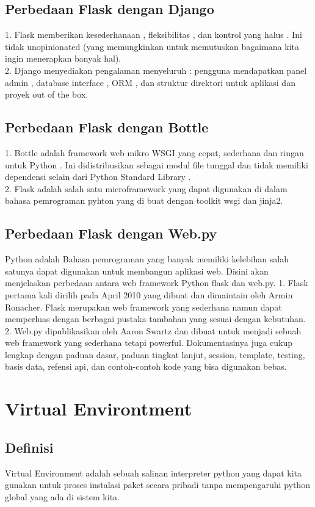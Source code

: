 \documentclass[12pt,a4paper]{article}
\begin{document}
\subsection{Perbedaan Flask dengan Django}
1.	Flask memberikan kesederhanaan , fleksibilitas , dan kontrol yang halus . Ini tidak unopinionated (yang memungkinkan untuk memutuskan bagaimana kita ingin menerapkan banyak hal).\\
2.  Django menyediakan pengalaman menyeluruh : pengguna mendapatkan panel admin , database interface , ORM , dan struktur direktori untuk aplikasi dan proyek out of the box.
\subsection{Perbedaan Flask dengan Bottle}
1.	Bottle adalah framework web mikro WSGI yang cepat, sederhana dan ringan untuk Python . Ini didistribusikan sebagai modul file tunggal dan tidak memiliki dependensi selain dari Python Standard Library .\\
2.	Flask adalah salah satu microframework yang dapat digunakan di dalam bahasa pemrograman pyhton yang di buat dengan toolkit wsgi dan jinja2.
\subsection{Perbedaan Flask dengan Web.py}
Python adalah Bahasa pemrograman yang banyak memiliki kelebihan salah satunya dapat digunakan untuk membangun aplikasi web. Disini akan menjelaskan perbedaan antara web framework Python flask dan web.py.
1.	Flask pertama kali dirilih pada April 2010 yang dibuat dan dimaintain oleh Armin Ronacher. Flask merupakan web framework yang sederhana namun dapat memperluas dengan berbagai pustaka tambahan yang sesuai dengan kebutuhan.
2.	Web.py dipublikasikan oleh Aaron Swartz dan dibuat untuk menjadi sebuah web framework yang sederhana tetapi powerful. Dokumentasinya juga cukup lengkap dengan paduan dasar, paduan tingkat lanjut, session, template, testing, basis data, refensi api, dan contoh-contoh kode yang bisa digunakan bebas.


\section{Virtual Environtment}
\subsection{Definisi}
\hspace{1cm} Virtual Environment adalah sebuah salinan interpreter python yang dapat kita gunakan untuk proses instalasi paket secara pribadi tanpa mempengaruhi python global yang ada di sistem kita.
\end{document}
